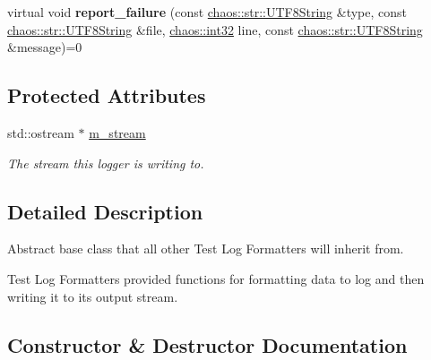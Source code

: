 \begin{DoxyCompactItemize}
\item 
\hypertarget{classchaos_1_1test_1_1log__formatter_1_1_abstract_test_log_formatter_ac262617f960d1f2ccc5834609f56a155}{}virtual void {\bfseries report\+\_\+failure} (const \hyperlink{classchaos_1_1str_1_1_u_t_f8_string}{chaos\+::str\+::\+U\+T\+F8\+String} \&type, const \hyperlink{classchaos_1_1str_1_1_u_t_f8_string}{chaos\+::str\+::\+U\+T\+F8\+String} \&file, \hyperlink{namespacechaos_ad1de7efb430365afd2c9446a0f522a90}{chaos\+::int32} line, const \hyperlink{classchaos_1_1str_1_1_u_t_f8_string}{chaos\+::str\+::\+U\+T\+F8\+String} \&message)=0\label{classchaos_1_1test_1_1log__formatter_1_1_abstract_test_log_formatter_ac262617f960d1f2ccc5834609f56a155}

\end{DoxyCompactItemize}
\subsection*{Protected Attributes}
\begin{DoxyCompactItemize}
\item 
\hypertarget{classchaos_1_1test_1_1log__formatter_1_1_abstract_test_log_formatter_a39664df72c625247706e85fe7a7d3272}{}std\+::ostream $\ast$ \hyperlink{classchaos_1_1test_1_1log__formatter_1_1_abstract_test_log_formatter_a39664df72c625247706e85fe7a7d3272}{m\+\_\+stream}\label{classchaos_1_1test_1_1log__formatter_1_1_abstract_test_log_formatter_a39664df72c625247706e85fe7a7d3272}

\begin{DoxyCompactList}\small\item\em The stream this logger is writing to. \end{DoxyCompactList}\end{DoxyCompactItemize}


\subsection{Detailed Description}
Abstract base class that all other Test Log Formatters will inherit from. 

Test Log Formatters provided functions for formatting data to log and then writing it to it\textquotesingle{}s output stream. 

\subsection{Constructor \& Destructor Documentation}
\hypertarget{classchaos_1_1test_1_1log__formatter_1_1_abstract_test_log_formatter_a9b6256dad677274ae028f14a3f713ca0}{}
